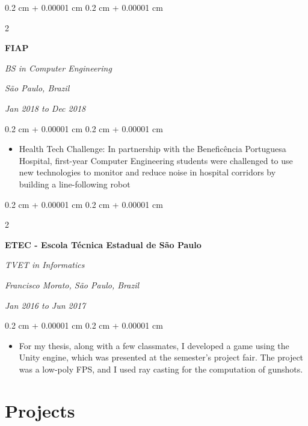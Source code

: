 \documentclass[10pt, a4paper]{article}
\newenvironment{highlights}{
    \begin{itemize}[
        topsep=0.10 cm,
        parsep=0.10 cm,
        partopsep=0pt,
        itemsep=0pt,
        leftmargin=0.4 cm + 10pt
    ]
}{
    \end{itemize}
} %
\newenvironment{onecolentry}{
    \begin{adjustwidth}{
        0.2 cm + 0.00001 cm
    }{
        0.2 cm + 0.00001 cm
    }
}{
    \end{adjustwidth}
} %
\newenvironment{twocolentry}[2][]{
    \onecolentry
    \def\secondColumn{#2}
    \setcolumnwidth{\fill, 7 cm}
    \begin{paracol}{2}
}{
    \switchcolumn \raggedleft \secondColumn
    \end{paracol}
    \endonecolentry
} %
\begin{document}
        \vspace{0.2 cm}

        \begin{twocolentry}{
        \textit{São Paulo, Brazil}    
            
        \textit{Jan 2018 to Dec 2018}}
            \textbf{FIAP}

            \textit{BS in Computer Engineering}
        \end{twocolentry}

        \vspace{0.10 cm}
        \begin{onecolentry}
            \begin{highlights}
                \item Health Tech Challenge: In partnership with the Beneficência Portuguesa Hospital, first-year Computer Engineering students were challenged to use new technologies to monitor and reduce noise in hospital corridors by building a line-following robot
            \end{highlights}
        \end{onecolentry}


        \vspace{0.2 cm}

        \begin{twocolentry}{
        \textit{Francisco Morato, São Paulo, Brazil}    
            
        \textit{Jan 2016 to Jun 2017}}
            \textbf{ETEC - Escola Técnica Estadual de São Paulo}

            \textit{TVET in Informatics}
        \end{twocolentry}

        \vspace{0.10 cm}
        \begin{onecolentry}
            \begin{highlights}
                \item For my thesis, along with a few classmates, I developed a game using the Unity engine, which was presented at the semester's project fair. The project was a low-poly FPS, and I used ray casting for the computation of gunshots.
            \end{highlights}
        \end{onecolentry}



    
    \section{Projects}
\end{document}
